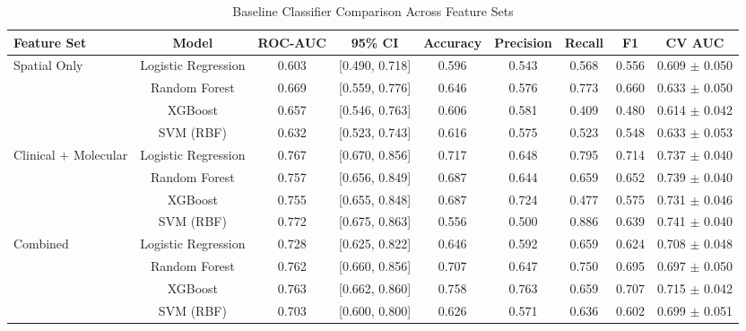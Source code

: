 \begin{table}[ht]
\centering
\caption{Baseline Classifier Comparison Across Feature Sets}
\label{tab:baseline_comparison}
\small
\begin{tabular}{lcccccccc}
\toprule
Feature Set & Model & ROC-AUC & 95\% CI & Accuracy & Precision & Recall & F1 & CV AUC \\
\midrule
  Spatial Only & Logistic Regression & 0.603 & [0.490, 0.718] & 0.596 & 0.543 & 0.568 & 0.556 & 0.609 $\pm$ 0.050 \\
   & Random Forest & 0.669 & [0.559, 0.776] & 0.646 & 0.576 & 0.773 & 0.660 & 0.633 $\pm$ 0.050 \\
   & XGBoost & 0.657 & [0.546, 0.763] & 0.606 & 0.581 & 0.409 & 0.480 & 0.614 $\pm$ 0.042 \\
   & SVM (RBF) & 0.632 & [0.523, 0.743] & 0.616 & 0.575 & 0.523 & 0.548 & 0.633 $\pm$ 0.053 \\
  \cmidrule{1-9}
  Clinical + Molecular & Logistic Regression & 0.767 & [0.670, 0.856] & 0.717 & 0.648 & 0.795 & 0.714 & 0.737 $\pm$ 0.040 \\
   & Random Forest & 0.757 & [0.656, 0.849] & 0.687 & 0.644 & 0.659 & 0.652 & 0.739 $\pm$ 0.040 \\
   & XGBoost & 0.755 & [0.655, 0.848] & 0.687 & 0.724 & 0.477 & 0.575 & 0.731 $\pm$ 0.046 \\
   & SVM (RBF) & 0.772 & [0.675, 0.863] & 0.556 & 0.500 & 0.886 & 0.639 & 0.741 $\pm$ 0.040 \\
  \cmidrule{1-9}
  Combined & Logistic Regression & 0.728 & [0.625, 0.822] & 0.646 & 0.592 & 0.659 & 0.624 & 0.708 $\pm$ 0.048 \\
   & Random Forest & 0.762 & [0.660, 0.856] & 0.707 & 0.647 & 0.750 & 0.695 & 0.697 $\pm$ 0.050 \\
   & XGBoost & 0.763 & [0.662, 0.860] & 0.758 & 0.763 & 0.659 & 0.707 & 0.715 $\pm$ 0.042 \\
   & SVM (RBF) & 0.703 & [0.600, 0.800] & 0.626 & 0.571 & 0.636 & 0.602 & 0.699 $\pm$ 0.051 \\
\bottomrule
\end{tabular}
\end{table}

